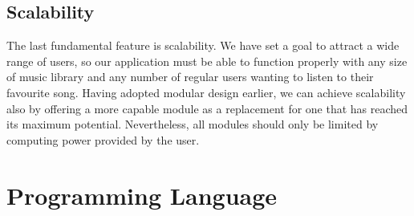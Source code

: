\subsection{Scalability}

The last fundamental feature is scalability. We have set a goal to attract a wide range of users, so our application must be able to function properly with any size of music library and any number of regular users wanting to listen to their favourite song. Having adopted modular design earlier, we can achieve scalability also by offering a more capable module as a replacement for one that has reached its maximum potential. Nevertheless, all modules should only be limited by computing power provided by the user.

\section{Programming Language}

